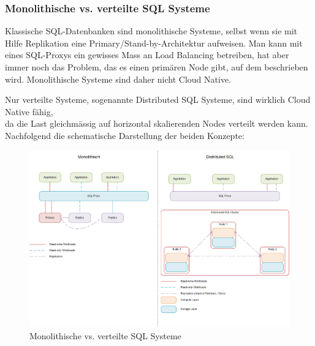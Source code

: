 
\subsubsection{Monolithische vs. verteilte SQL Systeme}
\begin{flushleft}
    Klassische SQL-Datenbanken sind monolithische Systeme, selbst wenn sie mit Hilfe Replikation eine Primary/Stand-by-Architektur aufweisen.
    Man kann mit eines SQL-Proxys ein gewisses Mass an Load Balancing betreiben, hat aber immer noch das Problem, das es einen primären Node gibt, auf dem beschrieben wird.
    Monolithische Systeme sind daher nicht Cloud Native.
\end{flushleft}
\begin{flushleft}
    Nur verteilte Systeme, sogenannte Distributed SQL Systeme, sind wirklich Cloud Native fähig,\\
    da die Last gleichmässig auf horizontal skalierenden Nodes verteilt werden kann.\\
    Nachfolgend die schematische Darstellung der beiden Konzepte:
    \begin{figure}[H]
        \centering
        \includegraphics[width=1\linewidth]{source/implementation/evaluation/excursus_architecture/monolith_distributed}
        \caption{Monolithische vs. verteilte SQL Systeme}
        \label{fig:Monolith_vs_Distributed_SQL}
    \end{figure}
\end{flushleft}
